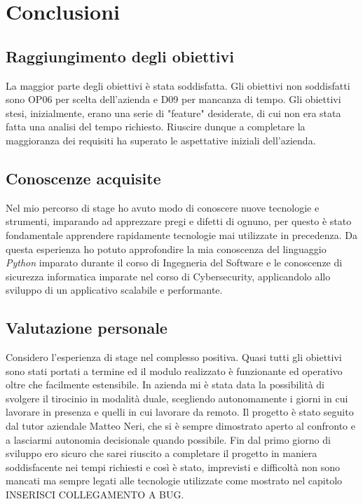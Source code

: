

\chapter{Conclusioni}
\label{cap:conclusioni}

\section{Raggiungimento degli obiettivi}
La maggior parte degli obiettivi è stata soddisfatta. Gli obiettivi non soddisfatti sono OP06 per scelta dell'azienda e D09 per mancanza di tempo. Gli obiettivi stesi, inizialmente, erano una serie di "feature" desiderate, di cui non era stata fatta una analisi del tempo richiesto. Riuscire dunque a completare la maggioranza dei requisiti ha superato le aspettative iniziali dell'azienda.

\section{Conoscenze acquisite}
Nel mio percorso di stage ho avuto modo di conoscere nuove tecnologie e strumenti, imparando ad apprezzare pregi e difetti di ognuno, per questo è stato fondamentale apprendere rapidamente tecnologie mai utilizzate in precedenza.
Da questa esperienza ho potuto approfondire la mia conoscenza del linguaggio \textit{Python} imparato durante il corso di Ingegneria del Software e le conoscenze di sicurezza informatica imparate nel corso di Cybersecurity, applicandolo allo sviluppo di un applicativo scalabile e performante.

\section{Valutazione personale}

Considero l'esperienza di stage nel complesso positiva. Quasi tutti gli obiettivi sono stati portati a termine ed il modulo realizzato è funzionante ed operativo oltre che facilmente estensibile. In azienda mi è stata data la possibilità di svolgere il tirocinio in modalità duale, scegliendo autonomamente i giorni in cui lavorare in presenza e quelli in cui lavorare da remoto. Il progetto è stato seguito dal tutor aziendale Matteo Neri, che si è sempre dimostrato aperto al confronto e a lasciarmi autonomia decisionale quando possibile. \newline{}
Fin dal primo giorno di sviluppo ero sicuro che sarei riuscito a completare il progetto in maniera soddisfacente nei tempi richiesti e così è stato, imprevisti e difficoltà non sono mancati ma sempre legati alle tecnologie utilizzate come mostrato nel capitolo INSERISCI COLLEGAMENTO A BUG.
